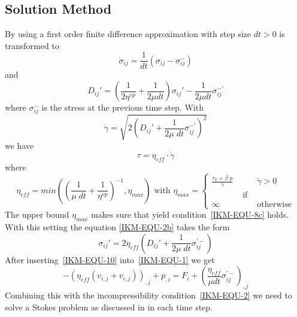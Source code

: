 \subsection{Solution Method \label{IKM-SOLVE}}
By using a first order finite difference approximation with step size
$dt>0$  is transformed to
\begin{equation}\label{IKM-EQU-3b}
\dot{\sigma}_{ij}=\frac{1}{dt } \left( \sigma_{ij} - \sigma_{ij}^{-} \right)
\end{equation}
and
\begin{equation}\label{IKM-EQU-2b}
D_{ij}'=\left(\frac{1}{2 \eta^{vp}} + \frac{1}{2 \mu dt}\right) \sigma_{ij}'-\frac{1}{2 \mu dt } \sigma_{ij}^{-'}
\end{equation}
where $\sigma_{ij}^{-}$ is the stress at the previous time step. With
\begin{equation}\label{IKM-EQU-2c}
\dot{\gamma} = \sqrt{ 2 \left( D_{ij}' +
\frac{1}{  2 \mu \; dt} \sigma_{ij}^{-'}\right)^2}
\end{equation} 
we have
\begin{equation}
\tau = \eta_{eff} \cdot \dot{\gamma}
\end{equation} 
where
\begin{equation}
\eta_{eff}= min( \left(\frac{1}{\mu \; dt}+\frac{1}{\eta^{vp}}\right)^{-1} 
, \eta_{max}) \mbox{ with } 
\eta_{max} = \left\{ 
\begin{array}{rcl}
\frac{\tau_{Y} + \beta \; p}{\dot{\gamma}} & & \dot{\gamma}>0 \\
&\mbox{ if } \\ 
\infty & & \mbox{otherwise}
\end{array}
\right.
\end{equation}
The upper bound $\eta_{max}$ makes sure that yield condition~\ref{IKM-EQU-8c}
holds. With this setting the equation \ref{IKM-EQU-2b} takes the form
\begin{equation}\label{IKM-EQU-10}
\sigma_{ij}' =  2 \eta_{eff}  \left( D_{ij}' +
\frac{1}{  2 \mu \; dt} \sigma_{ij}^{'-}\right)  
\end{equation}
After inserting~\ref{IKM-EQU-10} into~\ref{IKM-EQU-1} we get
\begin{equation}\label{IKM-EQU-1ib}
-\left(\eta_{eff} (v_{i,j}+ v_{i,j})
\right)_{,j}+p_{,i}=F_{i}+
 \left(\frac{\eta_{eff}}{\mu dt } \sigma_{ij}^{'-} \right)_{,j}
\end{equation}
Combining this with the incompressibility condition~\ref{IKM-EQU-2} we need to
solve a Stokes problem as discussed in  in each time step.

